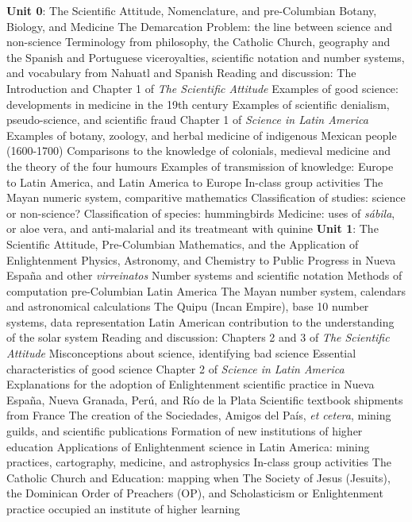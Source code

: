 \documentclass[10pt]{article}
\begin{document}
\begin{outline}[enumerate]
\1 \textbf{Unit 0}: The Scientific Attitude, Nomenclature, and pre-Columbian Botany, Biology, and Medicine
\2 The Demarcation Problem: the line between science and non-science
\2 Terminology from philosophy, the Catholic Church, geography and the Spanish and Portuguese viceroyalties, scientific notation and number systems, and vocabulary from Nahuatl and Spanish
\2 Reading and discussion:
\3 The Introduction and Chapter 1 of \textit{The Scientific Attitude}
\4 Examples of good science: developments in medicine in the 19th century
\4 Examples of scientific denialism, pseudo-science, and scientific fraud
\3 Chapter 1 of \textit{Science in Latin America}
\4 Examples of botany, zoology, and herbal medicine of indigenous Mexican people (1600-1700)
\4 Comparisons to the knowledge of colonials, medieval medicine and the theory of the four humours
\4 Examples of transmission of knowledge: Europe to Latin America, and Latin America to Europe
\2 In-class group activities
\3 The Mayan numeric system, comparitive mathematics
\3 Classification of studies: science or non-science?
\3 Classification of species: hummingbirds
\3 Medicine: uses of \textit{s\'{a}bila}, or aloe vera, and anti-malarial and its treatmeant with quinine
\1 \textbf{Unit 1}: The Scientific Attitude, Pre-Columbian Mathematics, and the Application of Enlightenment Physics, Astronomy, and Chemistry to Public Progress in Nueva Espa\~{n}a and other \textit{virreinatos}
\2 Number systems and scientific notation
\2 Methods of computation pre-Columbian Latin America
\3 The Mayan number system, calendars and astronomical calculations
\3 The Quipu (Incan Empire), base 10 number systems, data representation
\3 Latin American contribution to the understanding of the solar system
\2 Reading and discussion:
\3 Chapters 2 and 3 of \textit{The Scientific Attitude}
\4 Misconceptions about science, identifying bad science
\4 Essential characteristics of good science
\3 Chapter 2 of \textit{Science in Latin America}
\4 Explanations for the adoption of Enlightenment scientific practice in Nueva Espa\~{n}a, Nueva Granada, Per\'{u}, and R\'{i}o de la Plata
\4 Scientific textbook shipments from France
\4 The creation of the Sociedades, Amigos del Pa\'{i}s, \textit{et cetera}, mining guilds, and scientific publications
\4 Formation of new institutions of higher education
\4 Applications of Enlightenment science in Latin America: mining practices, cartography, medicine, and astrophysics
\2 In-class group activities
\3 The Catholic Church and Education: mapping when The Society of Jesus (Jesuits), the Dominican Order of Preachers (OP), and Scholasticism or Enlightenment practice occupied an institute of higher learning

\end{outline}
\end{document}
